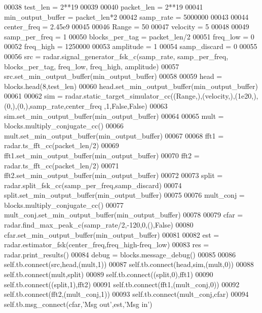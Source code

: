 \begin{DoxyCode}
00038         test\_len = 2**19
00039 
00040         packet\_len = 2**19
00041         min\_output\_buffer = packet\_len*2
00042         samp\_rate = 5000000
00043         
00044         center\_freq = 2.45e9
00045         
00046         Range = 50
00047         velocity = 5
00048                 
00049         samp\_per\_freq = 1
00050         blocks\_per\_tag = packet\_len/2
00051         freq\_low = 0
00052         freq\_high = 1250000
00053         amplitude = 1
00054         samp\_discard = 0
00055 
00056         src = radar.signal\_generator\_fsk\_c(samp\_rate, samp\_per\_freq, blocks\_per\_tag, freq\_low, freq\_high, 
      amplitude)
00057         src.set\_min\_output\_buffer(min\_output\_buffer)
00058         
00059         head = blocks.head(8,test\_len)
00060         head.set\_min\_output\_buffer(min\_output\_buffer)
00061         
00062         sim = radar.static\_target\_simulator\_cc((Range,),(velocity,),(1e20,),(0,),(0,),samp\_rate,center\_freq
      ,1,\textcolor{keyword}{False},\textcolor{keyword}{False})
00063         sim.set\_min\_output\_buffer(min\_output\_buffer)
00064         
00065         mult = blocks.multiply\_conjugate\_cc()
00066         mult.set\_min\_output\_buffer(min\_output\_buffer)
00067         
00068         fft1 = radar.ts\_fft\_cc(packet\_len/2)
00069         fft1.set\_min\_output\_buffer(min\_output\_buffer)
00070         fft2 = radar.ts\_fft\_cc(packet\_len/2)
00071         fft2.set\_min\_output\_buffer(min\_output\_buffer)
00072         
00073         split = radar.split\_fsk\_cc(samp\_per\_freq,samp\_discard)
00074         split.set\_min\_output\_buffer(min\_output\_buffer)
00075         
00076         mult\_conj = blocks.multiply\_conjugate\_cc()
00077         mult\_conj.set\_min\_output\_buffer(min\_output\_buffer)
00078         
00079         cfar = radar.find\_max\_peak\_c(samp\_rate/2,-120,0,(),\textcolor{keyword}{False})
00080         cfar.set\_min\_output\_buffer(min\_output\_buffer)
00081         
00082         est = radar.estimator\_fsk(center\_freq,freq\_high-freq\_low)
00083         res = radar.print\_results()
00084         debug = blocks.message\_debug()
00085 
00086         self.tb.connect(src,head,(mult,1))
00087         self.tb.connect(head,sim,(mult,0))
00088         self.tb.connect(mult,split)
00089         self.tb.connect((split,0),fft1)
00090         self.tb.connect((split,1),fft2)
00091         self.tb.connect(fft1,(mult\_conj,0))
00092         self.tb.connect(fft2,(mult\_conj,1))
00093         self.tb.connect(mult\_conj,cfar)
00094         self.tb.msg\_connect(cfar,\textcolor{stringliteral}{'Msg out'},est,\textcolor{stringliteral}{'Msg in'})

\end{DoxyCode}
